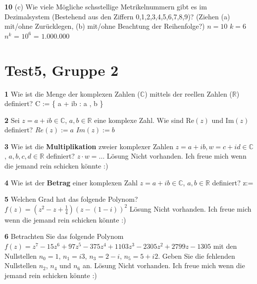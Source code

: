 \documentclass[11pt]{article}
\begin{document}
    \textbf{10} (c) Wie viele Mögliche schsstellige Metrikelnummern gibt es im Dezimalsystem (Bestehend aus den Ziffern {0,1,2,3,4,5,6,7,8,9})? (Ziehen (a) mit/ohne Zurücklegen, (b) mit/ohne Beachtung der Reihenfolge?)\newline
    $n = 10$\newline
    $k = 6$
    $n^{k}$ = $10^{6}$ = $1.000.000$

\section{Test5, Gruppe 2}

    \textbf{1} Wie ist die Menge der komplexen Zahlen (\(\mathbb{C}\)) mittels der reellen Zahlen (\(\mathbb{R}\)) definiert?\newline
    C := \{ a + ib : a \in {}, b \in {} \}\newline

    \textbf{2} Sei \( z = a + ib \in \mathbb{C} \), \( a,b \in \mathbb{R} \) eine komplexe Zahl. Wie sind \( \text{Re}(z) \) und \( \text{Im}(z) \) definiert?\newline
    $Re(z) := a$\newline
    $Im(z) := b$\newline

    \textbf{3} Wie ist die \textbf{Multiplikation} zweier komplexer Zahlen \( z = a + ib, w = c + id \in \mathbb{C} \), \( a,b,c,d \in \mathbb{R} \) definiert? \( z \cdot w = \ldots \)\newline
    Lösung Nicht vorhanden. Ich freue mich wenn die jemand rein schicken könnte :)\newline

    \textbf{4} Wie ist der \textbf{Betrag} einer komplexen Zahl \( z = a + ib \in \mathbb{C} \), \( a,b \in \mathbb{R} \) definiert?\newline
    \rvert z\rvert := \newline

    \textbf{5} Welchen Grad hat das folgende Polynom? \(f(z) = (z^2 - z + \frac{1}{4})(z - (1 - i))^2\)\newline
    Lösung Nicht vorhanden. Ich freue mich wenn die jemand rein schicken könnte :)\newline

    \textbf{6} Betrachten Sie das folgende Polynom \(f(z) = z^7 - 15z^6 + 97z^5 - 375z^4 + 1103z^3 - 2305z^2 + 2799z - 1305\) mit den Nullstellen \(n_0 = 1\), \(n_1 = i3\), \(n_3 = 2 - i\), \(n_5 = 5 + i2\). Geben Sie die fehlenden Nullstellen \(n_2\), \(n_4\) und \(n_6\) an.\newline
    Lösung Nicht vorhanden. Ich freue mich wenn die jemand rein schicken könnte :)\newline
\end{document}
